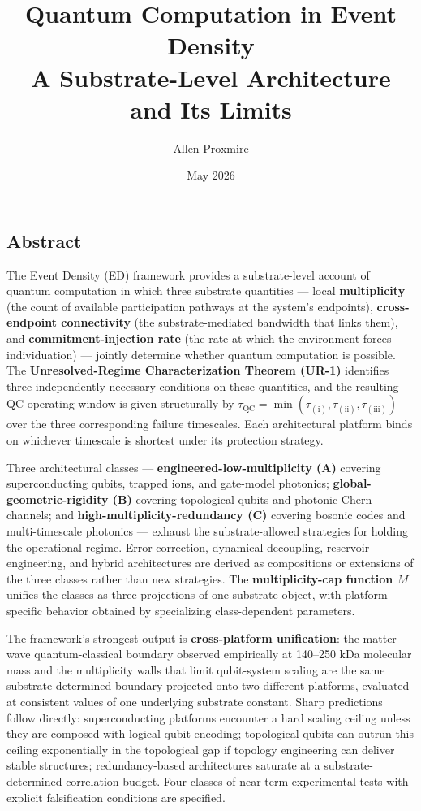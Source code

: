 \documentclass[
  11pt,
  a4paper,
]{article}
\title{Quantum Computation in Event Density\\
\large A Substrate-Level Architecture and Its Limits}
\author{Allen Proxmire}
\date{May 2026}
\begin{document}
\maketitle

\subsection{Abstract}\label{abstract}

The Event Density (ED) framework provides a substrate-level account of
quantum computation in which three substrate quantities --- local
\textbf{multiplicity} (the count of available participation pathways at
the system's endpoints), \textbf{cross-endpoint connectivity} (the
substrate-mediated bandwidth that links them), and
\textbf{commitment-injection rate} (the rate at which the environment
forces individuation) --- jointly determine whether quantum computation
is possible. The \textbf{Unresolved-Regime Characterization Theorem
(UR-1)} identifies three independently-necessary conditions on these
quantities, and the resulting QC operating window is given structurally
by
\(\tau_{\mathrm{QC}} = \min(\tau_{(\mathrm{i})}, \tau_{(\mathrm{ii})}, \tau_{(\mathrm{iii})})\)
over the three corresponding failure timescales. Each architectural
platform binds on whichever timescale is shortest under its protection
strategy.

Three architectural classes --- \textbf{engineered-low-multiplicity (A)}
covering superconducting qubits, trapped ions, and gate-model photonics;
\textbf{global-geometric-rigidity (B)} covering topological qubits and
photonic Chern channels; and \textbf{high-multiplicity-redundancy (C)}
covering bosonic codes and multi-timescale photonics --- exhaust the
substrate-allowed strategies for holding the operational regime. Error
correction, dynamical decoupling, reservoir engineering, and hybrid
architectures are derived as compositions or extensions of the three
classes rather than new strategies. The \textbf{multiplicity-cap
function \(M\)} unifies the classes as three projections of one
substrate object, with platform-specific behavior obtained by
specializing class-dependent parameters.

The framework's strongest output is \textbf{cross-platform unification}:
the matter-wave quantum-classical boundary observed empirically at
140--250 kDa molecular mass and the multiplicity walls that limit
qubit-system scaling are the same substrate-determined boundary
projected onto two different platforms, evaluated at consistent values
of one underlying substrate constant. Sharp predictions follow directly:
superconducting platforms encounter a hard scaling ceiling unless they
are composed with logical-qubit encoding; topological qubits can outrun
this ceiling exponentially in the topological gap if topology
engineering can deliver stable structures; redundancy-based
architectures saturate at a substrate-determined correlation budget.
Four classes of near-term experimental tests with explicit falsification
conditions are specified.
\end{document}
